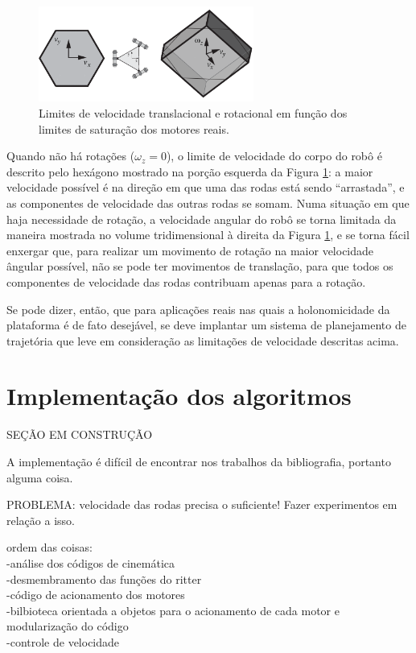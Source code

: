\begin{figure}[h]
  \centering
  \includegraphics[width = 0.63\textwidth]{imagens/twist_sat}
  \caption{Limites de velocidade translacional e rotacional em função dos limites de saturação dos motores reais.}
  \label{fig:twist_sat}
\end{figure}

Quando não há rotações ($\omega_z = 0$), o limite de velocidade do corpo do robô é descrito pelo hexágono mostrado na porção esquerda da Figura \ref{fig:twist_sat}: a maior velocidade possível é na direção em que uma das rodas está sendo ``arrastada'', e as componentes de velocidade das outras rodas se somam. Numa situação em que haja necessidade de rotação, a velocidade angular do robô se torna limitada da maneira mostrada no volume tridimensional à direita da Figura \ref{fig:twist_sat}, e se torna fácil enxergar que, para realizar um movimento de rotação na maior velocidade ângular possível, não se pode ter movimentos de translação, para que todos os componentes de velocidade das rodas contribuam apenas para a rotação.

Se pode dizer, então, que para aplicações reais nas quais a holonomicidade da plataforma é de fato desejável, se deve implantar um sistema de planejamento de trajetória que leve em consideração as limitações de velocidade descritas acima.

\section{Implementação dos algoritmos}
\label{sec:software}

SEÇÃO EM CONSTRUÇÃO

A implementação é difícil de encontrar nos trabalhos da bibliografia, portanto alguma coisa.

PROBLEMA: velocidade das rodas precisa o suficiente! Fazer experimentos em relação a isso.

ordem das coisas: \\
-análise dos códigos de cinemática \\
-desmembramento das funções do ritter \\
-código de acionamento dos motores \\
-bilbioteca orientada a objetos para o acionamento de cada motor e modularização do código\\
-controle de velocidade\\

